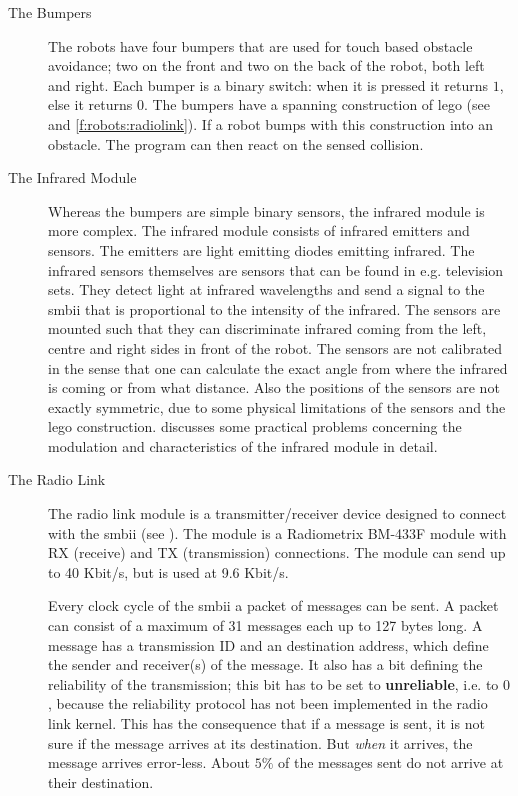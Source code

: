 \begin{description}
\item[The Bumpers] The robots have four bumpers that are used for touch based obstacle avoidance; two on the front and two on the back of the robot, both left and right. Each bumper is a binary switch: when it is pressed it returns $1$, else it returns $0$. The bumpers have a spanning construction of {\sc lego} (see  and \ref{f:robots:radiolink}). If a robot bumps with this construction into an obstacle. The program can then react on the sensed collision.
\item[The Infrared Module] Whereas the bumpers are simple binary sensors, the infrared module  is more complex. The infrared module consists of infrared emitters and sensors. The emitters are light emitting diodes emitting infrared. The infrared sensors themselves are sensors that can be found in e.g. television sets. They detect light at infrared wavelengths and send a signal to the {\sc smbii} that is proportional to the intensity of the infrared. The sensors are mounted such that they can discriminate infrared coming from the left, centre and right sides in front of the robot. The sensors are not calibrated in the sense that one can calculate the exact angle from where the infrared is coming or from what distance. Also the  positions of the sensors are not exactly symmetric, due to some physical limitations of the sensors and the {\sc lego} construction. \citet{vogt:1997} discusses some practical problems concerning the modulation and characteristics of the infrared module in detail.


\item[The Radio Link] The radio link module is a transmitter/receiver device designed to connect with the {\sc smbii} (see ). The module is a Radiometrix BM-433F module with RX (receive) and TX (transmission) connections. The module can send up to 40 Kbit/s, but is used at 9.6 Kbit/s. 

Every clock cycle of the {\sc smbii} a packet of messages can be sent. A packet can consist of a maximum of 31 messages each up to 127 bytes long. A message has a transmission ID and an destination address, which define the sender and receiver(s) of the message.  It also has a bit defining the reliability of the transmission; this bit has to be set to {\bf unreliable}, i.e. to $0$, because the reliability protocol has not been implemented in the radio link kernel. This has the consequence that if a message is sent, it is not sure if the message arrives at its destination. But {\em when} it arrives, the message arrives error-less. About $5\%$ of the messages sent do not arrive at their destination.


\end{description}
